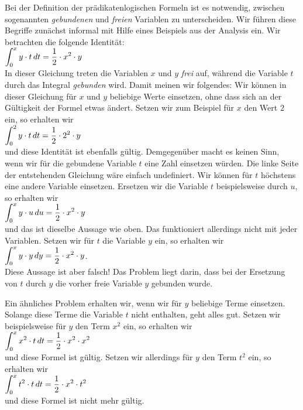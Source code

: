 \noindent
Bei der Definition der pr\"{a}dikatenlogischen Formeln ist es notwendig,
zwischen sogenannten {\emph{\color{blue}gebundenen}} und {\emph{\color{blue}freien}} Variablen zu unterscheiden.
Wir f\"{u}hren diese Begriffe zun\"{a}chst informal mit Hilfe eines Beispiels aus der Analysis ein.
Wir betrachten die folgende Identit\"{a}t: \\[0.2cm]
\hspace*{1.3cm}
 $\displaystyle\int_{0}^{x} y \cdot  t\, d t = \frac{1}{2} \cdot x^2 \cdot  y$ 
\\[0.2cm]
In dieser Gleichung treten die Variablen $x$ und $y$ {\emph{\color{blue}frei}} auf, w\"{a}hrend die Variable $t$ durch das Integral
{\emph{\color{blue}gebunden}} wird.  Damit meinen wir folgendes: Wir k\"{o}nnen in dieser Gleichung f\"{u}r $x$ und $y$ beliebige Werte
 einsetzen, ohne dass sich an der 
G\"{u}ltigkeit der Formel etwas \"{a}ndert.  Setzen wir zum Beispiel f\"{u}r $x$ den Wert $2$ ein, so erhalten wir \\[0.2cm]
\hspace*{1.3cm}
$\displaystyle\int_{0}^{2} y \cdot  t\, d t = \frac{1}{2} \cdot 2^2 \cdot  y$ \\[0.2cm]
und diese Identit\"{a}t ist ebenfalls g\"{u}ltig.  Demgegen\"{u}ber macht es keinen Sinn, wenn wir f\"{u}r die gebundene Variable
 $t$ eine Zahl einsetzen w\"{u}rden.
Die linke Seite der entstehenden Gleichung w\"{a}re einfach undefiniert.  Wir k\"{o}nnen f\"{u}r $t$
h\"{o}chstens eine andere Variable einsetzen. 
Ersetzen wir die Variable $t$ beispielsweise durch $u$, so erhalten wir \\[0.2cm]
\hspace*{1.3cm}
$\displaystyle\int_{0}^{x} y \cdot  u\, d u = \frac{1}{2} \cdot x^2 \cdot  y$ 
\\[0.2cm]
und das ist dieselbe Aussage wie oben.  Das funktioniert allerdings nicht mit jeder Variablen. Setzen wir
f\"{u}r $t$ die Variable $y$ ein, so erhalten wir \\[0.2cm]
\hspace*{1.3cm}
$\displaystyle\int_{0}^{x} y \cdot  y\, d y = \frac{1}{2} \cdot x^2 \cdot  y$. \\[0.2cm]
Diese Aussage ist aber falsch!  Das Problem liegt darin, dass bei der Ersetzung von $t$ durch $y$ die vorher freie Variable
$y$ gebunden wurde.  

Ein \"{a}hnliches Problem erhalten wir, wenn wir f\"{u}r $y$ beliebige Terme einsetzen.  Solange diese Terme die Variable $t$ 
nicht enthalten, geht alles gut.  Setzen wir beispielsweise f\"{u}r $y$  den Term $x^2$ ein, so erhalten
wir \\[0.2cm]
\hspace*{1.3cm}
$\displaystyle\int_{0}^{x} x^2 \cdot  t\, d t = \frac{1}{2} \cdot x^2 \cdot  x^2$ 
\\[0.2cm]
und diese Formel ist g\"{u}ltig.  Setzen wir allerdings f\"{u}r $y$ den Term $t^2$ ein, so erhalten wir \\[0.2cm]
\hspace*{1.3cm}
$\displaystyle\int_{0}^{x} t^2 \cdot  t\, d t = \frac{1}{2} \cdot x^2 \cdot  t^2$ 
\\[0.2cm]
und diese Formel ist nicht mehr g\"{u}ltig. 

